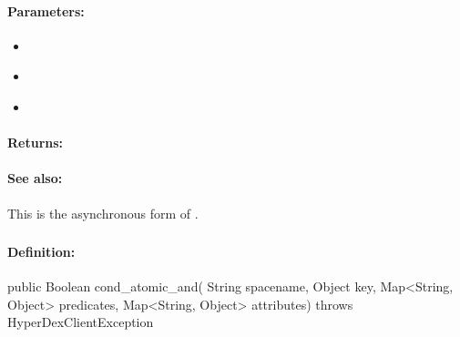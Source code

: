 \paragraph{Parameters:}
\begin{itemize}[noitemsep]
\item {}\\

\item {}\\

\item {}\\

\end{itemize}

\paragraph{Returns:}


\paragraph{See also:}  This is the asynchronous form of .

\pagebreak
\subsubsection{}
\label{api:java:cond_atomic_and}


\paragraph{Definition:}
\begin{javacode}
public Boolean cond_atomic_and(
        String spacename,
        Object key,
        Map<String, Object> predicates,
        Map<String, Object> attributes) throws HyperDexClientException
\end{javacode}

